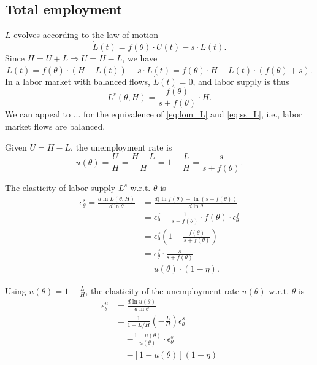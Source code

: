\documentclass[12pt]{article}
\begin{document}
\subsection{Total employment}
$L$ evolves according to the law of motion
\begin{equation} \label{eq:lom_L}
    \dot L(t) = f(\theta) \cdot U(t) - s \cdot L(t).
\end{equation}
Since $H = U + L \Rightarrow U = H - L$, we have
\begin{equation}
    \dot L(t) = f(\theta) \cdot (H - L(t)) - s \cdot L(t) = f(\theta) \cdot H - L(t) \cdot (f(\theta) + s).
\end{equation}
In a labor market with balanced flows, $\dot L(t) = 0$, and labor supply is thus
\begin{equation} \label{eq:ss_L}
    L^{s}(\theta, H) = \frac{f(\theta)}{s + f(\theta)} \cdot H.
\end{equation}
We can appeal to ... for the equivalence of \ref{eq:lom_L} and \ref{eq:ss_L}, i.e., labor market flows are balanced.

Given $U = H - L$, the unemployment rate is
\begin{equation}
    u(\theta) = \frac{U}{H} = \frac{H - L}{H} = 1 - \frac{L}{H} = \frac{s}{s + f(\theta)}.
\end{equation}

The elasticity of labor supply $L^s$ w.r.t. $\theta$ is
\begin{align*}
    \epsilon^s_\theta = \frac{d \ln L(\theta, H)}{d \ln \theta} &= \frac{d (\ln f(\theta) - \ln (s + f(\theta))}{d \ln \theta} \\
    &= \epsilon^f_\theta - \frac{1}{s + f(\theta)} \cdot f(\theta) \cdot \epsilon^f_\theta \\
    &= \epsilon^f_\theta \left( 1 - \frac{f(\theta)}{s + f(\theta)} \right) \\
    &= \epsilon^f_\theta \cdot \frac{s}{s + f(\theta)} \\
    &= u(\theta) \cdot (1 - \eta).
\end{align*}

Using $u(\theta) = 1 - \frac{L}{H}$, the elasticity of the unemployment rate $u(\theta)$ w.r.t. $\theta$ is
\begin{align*}
    \epsilon^u_\theta &= \frac{d \ln u(\theta)}{d \ln \theta} \\
    &= \frac{1}{1 - L/H} \left( -\frac{L}{H} \right) \epsilon^s_\theta \\
    &= -\frac{1 - u(\theta)}{u(\theta)} \cdot \epsilon^s_\theta \\
    &= -[1-u(\theta)] (1-\eta)
\end{align*}
\end{document}
